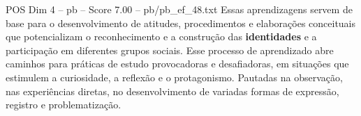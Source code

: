 \begin{textsample}{POS Dim 4 – pb – Score 7.00 – pb/pb\_ef\_48.txt}
Essas aprendizagens servem de base para o desenvolvimento de atitudes, procedimentos e elaborações conceituais que potencializam o reconhecimento e a construção das \textbf{identidades} e a participação em diferentes grupos sociais.
Esse processo de aprendizado abre caminhos para práticas de estudo provocadoras e desafiadoras, em situações que estimulem a curiosidade, a reflexão e o protagonismo.
Pautadas na observação, nas experiências diretas, no desenvolvimento de variadas formas de expressão, registro e problematização.

\end{textsample}
